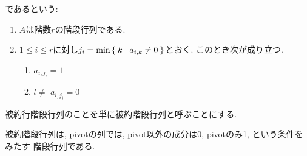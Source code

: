 \begin{definition}
 であるという:
  \begin{enumerate}
  \item $A$は階数$r$の階段行列である.
  \item $1\leq i \leq r$に対し$j_i = \min\Set{k|a_{i,k}\neq 0}$とおく.
    このとき次が成り立つ.
    \begin{enumerate}
      \item $a_{i,j_i}=1$
      \item $l\neq $ $a_{l,j_i}=0$
    \end{enumerate}
  \end{enumerate}
  被約行階段行列のことを単に被約階段行列と呼ぶことにする.
\end{definition}
被約階段行列は,
pivotの列では, pivot以外の成分は0, pivotのみ1, という条件をみたす
階段行列である.

